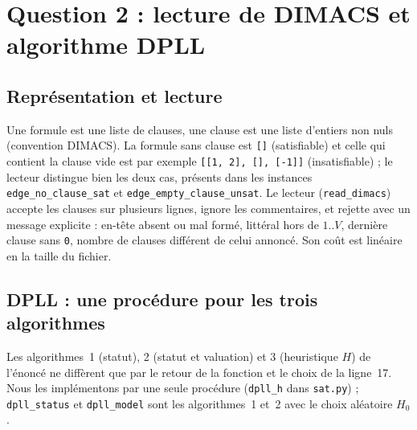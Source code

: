 \documentclass[11pt,a4paper]{article}
\begin{document}
\section{Question 2 : lecture de DIMACS et algorithme DPLL}\label{sec:q2}

\subsection{Représentation et lecture}

Une formule est une liste de clauses, une clause est une liste d'entiers non nuls (convention DIMACS). La formule sans clause est \texttt{[]} (satisfiable) et celle qui contient la clause vide est par exemple \texttt{[[1, 2], [], [-1]]} (insatisfiable) ; le lecteur distingue bien les deux cas, présents dans les instances \texttt{edge\_no\_clause\_sat} et \texttt{edge\_empty\_clause\_unsat}. Le lecteur (\texttt{read\_dimacs}) accepte les clauses sur plusieurs lignes, ignore les commentaires, et rejette avec un message explicite : en-tête absent ou mal formé, littéral hors de $1..V$, dernière clause sans \texttt{0}, nombre de clauses différent de celui annoncé. Son coût est linéaire en la taille du fichier.

\subsection{DPLL : une procédure pour les trois algorithmes}

Les algorithmes~1 (statut), 2 (statut et valuation) et 3 (heuristique $H$) de l'énoncé ne diffèrent que par le retour de la fonction et le choix de la ligne~17. Nous les implémentons par une seule procédure (\texttt{dpll\_h} dans \texttt{sat.py}) ; \texttt{dpll\_status} et \texttt{dpll\_model} sont les algorithmes~1 et~2 avec le choix aléatoire $H_0$.
\end{document}
